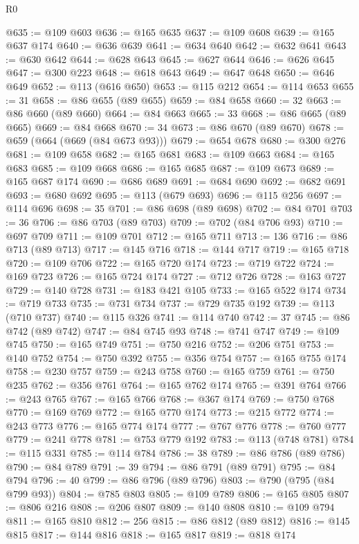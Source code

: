 \begin{lexlean}{R0}
\begin{coremodule}
@635 := @109 @603
@636 := @165 @635
@637 := @109 @608
@639 := @165 @637 @174
@640 := @636 @639
@641 := @634 @640
@642 := @632 @641
@643 := @630 @642
@644 := @628 @643
@645 := @627 @644
@646 := @626 @645
@647 := @300 @223
@648 := @618 @643
@649 := @647 @648
@650 := @646 @649
@652 := @113 (@616 @650)
@653 := @115 @212
@654 := @114 @653
@655 := 31
@658 := @86 @655 (@89 @655)
@659 := @84 @658
@660 := 32
@663 := @86 @660 (@89 @660)
@664 := @84 @663
@665 := 33
@668 := @86 @665 (@89 @665)
@669 := @84 @668
@670 := 34
@673 := @86 @670 (@89 @670)
@678 := @659 (@664 (@669 (@84 @673 @93)))
@679 := @654 @678
@680 := @300 @276
@681 := @109 @658
@682 := @165 @681
@683 := @109 @663
@684 := @165 @683
@685 := @109 @668
@686 := @165 @685
@687 := @109 @673
@689 := @165 @687 @174
@690 := @686 @689
@691 := @684 @690
@692 := @682 @691
@693 := @680 @692
@695 := @113 (@679 @693)
@696 := @115 @256
@697 := @114 @696
@698 := 35
@701 := @86 @698 (@89 @698)
@702 := @84 @701
@703 := 36
@706 := @86 @703 (@89 @703)
@709 := @702 (@84 @706 @93)
@710 := @697 @709
@711 := @109 @701
@712 := @165 @711
@713 := 136
@716 := @86 @713 (@89 @713)
@717 := @145 @716
@718 := @144 @717
@719 := @165 @718
@720 := @109 @706
@722 := @165 @720 @174
@723 := @719 @722
@724 := @169 @723
@726 := @165 @724 @174
@727 := @712 @726
@728 := @163 @727
@729 := @140 @728
@731 := @183 @421 @105
@733 := @165 @522 @174
@734 := @719 @733
@735 := @731 @734
@737 := @729 @735 @192
@739 := @113 (@710 @737)
@740 := @115 @326
@741 := @114 @740
@742 := 37
@745 := @86 @742 (@89 @742)
@747 := @84 @745 @93
@748 := @741 @747
@749 := @109 @745
@750 := @165 @749
@751 := @750 @216
@752 := @206 @751
@753 := @140 @752
@754 := @750 @392
@755 := @356 @754
@757 := @165 @755 @174
@758 := @230 @757
@759 := @243 @758
@760 := @165 @759
@761 := @750 @235
@762 := @356 @761
@764 := @165 @762 @174
@765 := @391 @764
@766 := @243 @765
@767 := @165 @766
@768 := @367 @174
@769 := @750 @768
@770 := @169 @769
@772 := @165 @770 @174
@773 := @215 @772
@774 := @243 @773
@776 := @165 @774 @174
@777 := @767 @776
@778 := @760 @777
@779 := @241 @778
@781 := @753 @779 @192
@783 := @113 (@748 @781)
@784 := @115 @331
@785 := @114 @784
@786 := 38
@789 := @86 @786 (@89 @786)
@790 := @84 @789
@791 := 39
@794 := @86 @791 (@89 @791)
@795 := @84 @794
@796 := 40
@799 := @86 @796 (@89 @796)
@803 := @790 (@795 (@84 @799 @93))
@804 := @785 @803
@805 := @109 @789
@806 := @165 @805
@807 := @806 @216
@808 := @206 @807
@809 := @140 @808
@810 := @109 @794
@811 := @165 @810
@812 := 256
@815 := @86 @812 (@89 @812)
@816 := @145 @815
@817 := @144 @816
@818 := @165 @817
@819 := @818 @174

\end{coremodule}
\end{lexlean}
